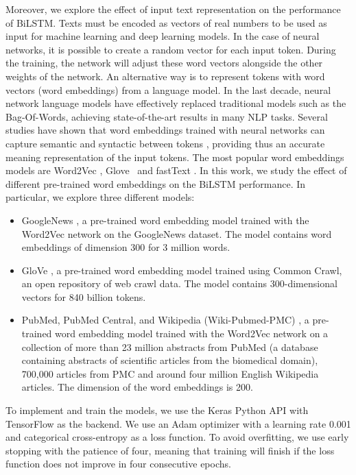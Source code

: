 \documentclass[preprint,12pt]{elsarticle}
\begin{document}
Moreover, we explore the effect of input text representation on the performance of BiLSTM. Texts must be encoded as vectors of real numbers to be used as input for machine learning and deep learning models. In the case of neural networks, it is possible to create a random vector for each input token. During the training, the network will adjust these word vectors alongside the other weights of the network.
An alternative way is to represent tokens with word vectors (word embeddings) from a language model. 
In the last decade, neural network language models \cite{mikolov2012context,arisoy2012deep} have effectively replaced traditional models such as the Bag-Of-Words, achieving state-of-the-art results in many NLP tasks. Several studies have shown that word embeddings trained with neural networks can capture semantic and syntactic between tokens \cite{mikolov2013distributed}, providing thus an accurate meaning representation of the input tokens. The most popular word embeddings models are Word2Vec \cite{mikolov2013distributed}, Glove \cite{pennington-etal-2014-glove}\ and fastText \cite{bojanowski2017enriching}. In this work, we study the effect of different pre-trained word embeddings on the BiLSTM performance. In particular, we explore three different models: 
\begin{itemize}
    \item GoogleNews \cite{NIPS2013_9aa42b31}, a pre-trained word embedding model trained with the Word2Vec network on the GoogleNews dataset. The model contains word embeddings of dimension 300 for 3 million words.
    \item GloVe \cite{pennington-etal-2014-glove}, a pre-trained word embedding model trained using Common Crawl, an open repository of web crawl data. The model contains 300-dimensional vectors for 840 billion tokens. 
    \item PubMed, PubMed Central, and Wikipedia (Wiki-Pubmed-PMC) \cite{pyysalo2013we}, a pre-trained word embedding model trained with the Word2Vec network on a collection of more than 23 million abstracts from PubMed (a database containing abstracts of scientific articles from the biomedical domain), 700,000 articles from PMC and around four million English Wikipedia articles. The dimension of the word embeddings is 200. 
    
\end{itemize}



To implement and train the models, we use the Keras Python API \cite{keras} with TensorFlow as the backend.
 We use an Adam optimizer \cite{kingma2017adam} with a learning rate 0.001 and categorical cross-entropy as a loss function. To avoid overfitting, we use early stopping with the patience of four, meaning that training will finish if the loss function does not improve in four consecutive epochs. 
 
\end{document}
